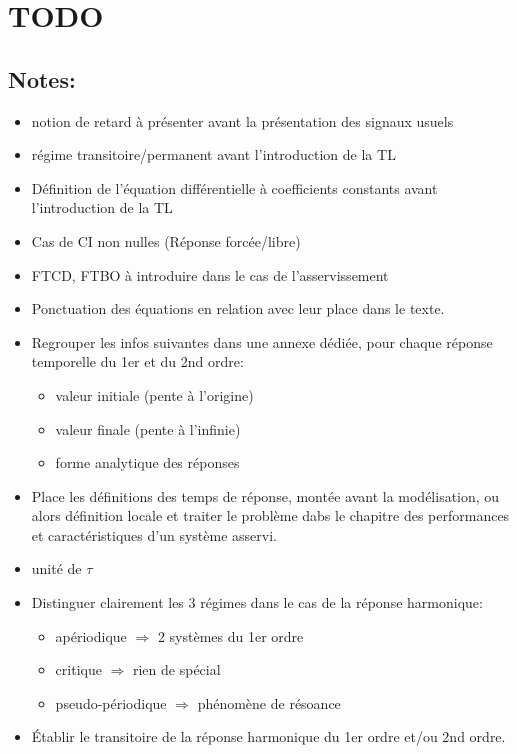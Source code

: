 \chapter{TODO}
\section{Notes:}

\begin{itemize}
\item notion de retard à présenter avant la présentation des signaux usuels
\item régime transitoire/permanent avant l'introduction de la TL
\item Définition de l'équation différentielle à coefficients constants avant l'introduction de la TL
\item Cas de CI non nulles (Réponse forcée/libre)
\item FTCD, FTBO à introduire dans le cas de l'asservissement
\item Ponctuation des équations en relation avec leur place dans le texte.
\item Regrouper les infos suivantes dans une annexe dédiée, pour chaque réponse temporelle du 1er et du 2nd ordre:
    \begin{itemize}
        \item valeur initiale (pente à l'origine)
        \item valeur finale (pente à l'infinie)
        \item forme analytique des réponses
    \end{itemize}
\item Place les définitions des temps de réponse, montée avant la modélisation, ou alors définition locale
    et traiter le problème dabs le chapitre des performances et caractéristiques d'un système asservi.
\item unité de $\tau$
\item Distinguer clairement les 3 régimes dans le cas de la réponse harmonique:
    \begin{itemize}
        \item apériodique $\Rightarrow$ 2 systèmes du 1er ordre
        \item critique $\Rightarrow$ rien de spécial
        \item pseudo-périodique $\Rightarrow$ phénomène de résoance
    \end{itemize}
\item \'Etablir le transitoire de la réponse harmonique du 1er ordre et/ou 2nd ordre.
\end{itemize}
